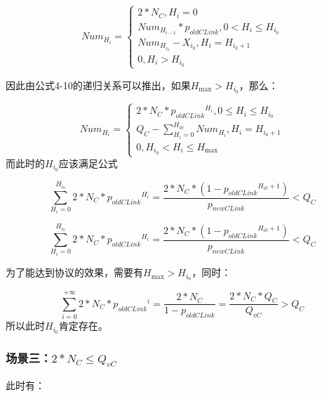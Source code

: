 \documentclass[figurelist,tablelist,algorithmlist,nomlist,masters]{seuthesix}
\begin{document}
	\begin{equation}\label{eq3.1}
	Nu{m_{{H_i}}} = \left\{ \begin{array}{l}
	2*N_C,{H_i} = 0\\
	Nu{m_{{H_{i - 1}}}}*{p_{oldCLink}},0 < {H_i} \le {H_{{i_0}}}\\
	Nu{m_{{H_{{i_0}}}}} - {X_{{i_0}}},{H_i} = {H_{{i_0} + 1}}\\
	0,{H_i} > {H_{{i_0}}}
	\end{array} \right.
	\end{equation}
	
	因此由公式4-10的递归关系可以推出，如果${H_{\max }} > {H_{{i_0}}}$，那么：
	
	\begin{equation}\label{eq3.1}
	Nu{m_{{H_i}}} = \left\{ \begin{array}{l}
	2*N_C*{p_{oldCLink}}^{{H_i}},0 \le {H_i} \le {H_{{i_0}}}\\
	Q_C - \sum\limits_{{H_i} = 0}^{{H_{i0}}} {Nu{m_{{H_i}}}} ,{H_i} = {H_{{i_0} + 1}}\\
	0,{H_{{i_0}}} < {H_i} \le {H_{\max }}
	\end{array} \right.
	\end{equation}
	而此时的${H_{{i_0}}}$应该满足公式
	
	\begin{equation}\label{eq3.1}
	\sum\limits_{{H_i} = 0}^{{H_{{i_0}}}} {2*N_C*{p_{oldCLink}}^{{H_i}}}  = \frac{{2*N_C*(1 - {p_{oldCLink}}^{{H_{i0}} + 1})}}{{{p_{newCLink}}}} < Q_C
	\end{equation}
	
	\begin{equation}\label{eq3.1}
	\sum\limits_{{H_i} = 0}^{{H_{{i_0}}}} {2*N_C*{p_{oldCLink}}^{{H_i}}}  = \frac{{2*N_C*(1 - {p_{oldCLink}}^{{H_{i0}} + 1})}}{{{p_{newCLink}}}} < Q_C
	\end{equation}
	
	为了能达到协议的效果，需要有${H_{\max }} > {H_{{i_0}}}$，同时：
	
	\begin{equation}\label{eq3.1}
	\sum\limits_{i = 0}^{ + \infty } {2*N_C*{p_{oldCLink}}^i}  = \frac{{2*N_C}}{{1 - {p_{oldCLink}}}} = \frac{{2*N_C*Q_C}}{{Q_{vC}}} > Q_C
	\end{equation}
	所以此时${H_{{i_0}}}$肯定存在。
	
	\subsubsection{场景三：$2*N_C \le Q_{vC}$}
	此时有：
	
\end{document}
